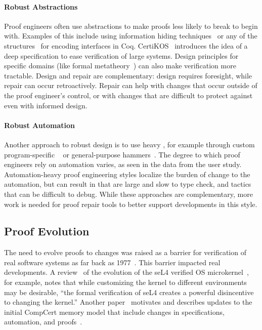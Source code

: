 \paragraph{Robust Abstractions}
Proof engineers often use abstractions to make proofs less likely to break to begin with.
Examples of this include using 
information hiding techniques~\cite{Woos:2016:PCF:2854065.2854081, Klein2014}
or any of the structures~\cite{Chrzaszcz2004, Sozeau2008, Saibi:PhD} for encoding interfaces in Coq.
CertiKOS~\cite{certikos} introduces the idea of a deep specification to ease verification of large systems.
Design principles for specific domains (like formal metatheory~\cite{Aydemir2008, Delaware2013POPL, Delaware2013ICFP})
can also make verification more tractable.
Design and repair are complementary: design requires foresight, while repair can occur retroactively.
Repair can help with changes that occur outside of the proof engineer's control,
or with changes that are difficult to protect against even with informed design.

\paragraph{Robust Automation}
Another approach to robust design is to use heavy , for example through
custom program-specific ~\cite{chlipala:cpdt}
or general-purpose hammers~\cite{Blanchette2016b, Blanchette2013, Kaliszyk2014, Czajka2018}.
The degree to which proof engineers rely on automation varies, as seen in the data from the  user study.
Automation-heavy proof engineering styles localize the burden of change to the automation,
but can result in  that are large and slow to type check,
and tactics that can be difficult to debug.
While these approaches are complementary, more work is needed for proof repair tools to better support 
developments in this style.

\subsection{Proof Evolution}
\label{sec:refrep}


The need to evolve proofs to changes was raised as a barrier for verification of real software systems as far back as 1977~\cite{DeMillo1977}.
This barrier impacted real developments.
A review~\cite{Elphinstone2013} of the evolution of the seL4 verified 
OS microkernel~\cite{Klein2009}, for example, notes that while
customizing the kernel to different environments may be desirable, 
``the formal verification of seL4 creates a powerful disincentive to changing the kernel.''
Another paper~\cite{leroy2012} motivates and describes updates to the initial CompCert memory model
that include changes in specifications, automation, and proofs~\cite{leroy-mem-2010}.

